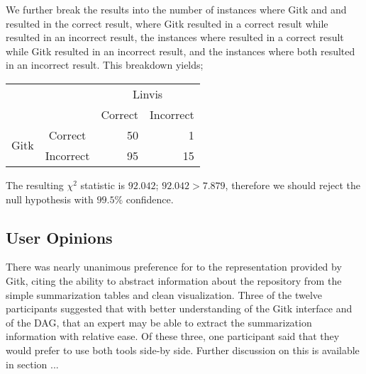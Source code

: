 We further break the results into the number of instances where Gitk and
and \tool resulted in the correct result, where Gitk resulted in a
correct result while \tool resulted in an incorrect result, the
instances where \tool resulted in a correct result while Gitk resulted
in an incorrect result, and the instances where both resulted in an
incorrect result. This breakdown yields;

\begin{center}
  \begin{tabular}{cc|rr}
                          &           & \multicolumn{2}{c}{Linvis}\\
                          &           & Correct                      & Incorrect\\\hline
    \multirow{2}{*}{Gitk} & Correct   & 50                           & 1\\
                          & Incorrect & 95                           & 15\\
  \end{tabular}
\end{center}

The resulting $\chi^2$ statistic is $92.042$; $92.042 > 7.879$,
therefore we should reject the null hypothesis with $99.5\%$ confidence.


\subsection{User Opinions}
\label{sub:user_opinions}

There was nearly unanimous preference for \tool to the representation
provided by Gitk, citing the ability to abstract information about the
repository from the simple summarization tables and clean visualization.
Three of the twelve participants suggested that with better
understanding of the Gitk interface and of the DAG, that an expert may
be able to extract the summarization information with relative ease. Of
these three, one participant said that they would prefer to use both
tools side-by side. Further discussion on this is available in section
... %

